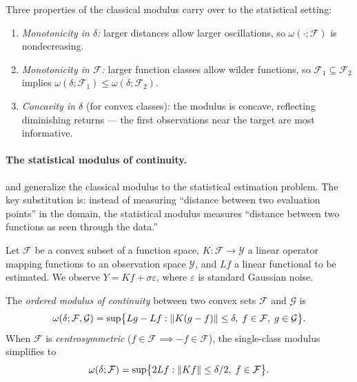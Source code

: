 Three properties of the classical modulus carry over to the statistical setting:
\begin{enumerate}
	\item \emph{Monotonicity in $\delta$:} larger distances allow larger oscillations, so $\omega(\cdot; \mathcal{F})$ is nondecreasing.
	\item \emph{Monotonicity in $\mathcal{F}$:} larger function classes allow wilder functions, so $\mathcal{F}_1 \subseteq \mathcal{F}_2$ implies $\omega(\delta; \mathcal{F}_1) \leq \omega(\delta; \mathcal{F}_2)$.
	\item \emph{Concavity in $\delta$} (for convex classes): the modulus is concave, reflecting diminishing returns --- the first observations near the target are most informative.
\end{enumerate}

\paragraph{The statistical modulus of continuity.}
\textcite{donoho_statistical_1994} and \textcite{armstrong_optimal_2018} generalize the classical modulus to the statistical estimation problem.
The key substitution is: instead of measuring ``distance between two evaluation points'' in the domain, the statistical modulus measures ``distance between two functions as seen through the data.''

Let $\mathcal{F}$ be a convex subset of a function space, $K \colon \mathcal{F} \to \mathcal{Y}$ a linear operator mapping functions to an observation space $\mathcal{Y}$, and $Lf$ a linear functional to be estimated.
We observe $Y = Kf + \sigma\varepsilon$, where $\varepsilon$ is standard Gaussian noise.

The \emph{ordered modulus of continuity} between two convex sets $\mathcal{F}$ and $\mathcal{G}$ is
\begin{equation}\label{eq:modulus_two_class}
	\omega(\delta; \mathcal{F}, \mathcal{G}) = \sup\bigl\{ Lg - Lf : \lVert K(g - f)\rVert \leq \delta,\; f \in \mathcal{F},\; g \in \mathcal{G} \bigr\}.
\end{equation}
When $\mathcal{F}$ is \emph{centrosymmetric} ($f \in \mathcal{F} \implies -f \in \mathcal{F}$), the single-class modulus simplifies to
\begin{equation}\label{eq:modulus_single}
	\omega(\delta; \mathcal{F}) = \sup\bigl\{ 2Lf : \lVert Kf\rVert \leq \delta/2,\; f \in \mathcal{F} \bigr\}.
\end{equation}

